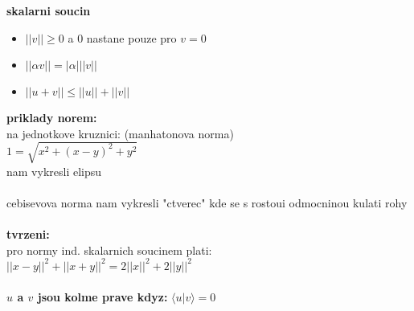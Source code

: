 \documentclass[a4paper]{article}
\begin{document}
\textbf{skalarni soucin}\\
\begin{itemize}
    \item $||v|| \geq 0$ a $0$ nastane pouze pro $v=0$
    \item $||\alpha v|| = |\alpha| ||v||$
    \item $||u+v|| \leq ||u|| + ||v||$ 
\end{itemize}

\textbf{priklady norem:}\\
na jednotkove kruznici: (manhatonova norma)\\
$1=\sqrt{x^2+(x-y)^2+y^2}$\\
nam vykresli elipsu\\
\\
cebisevova norma nam vykresli "ctverec" kde se s rostoui odmocninou kulati rohy\\
\\
\textbf{tvrzeni:}\\
pro normy ind. skalarnich soucinem plati:\\
$ ||x-y||^2 + ||x+y||^2 = 2||x||^2 + 2||y||^2 $\\
\\
\textbf{$u$ a $v$ jsou kolme prave kdyz:}
$\langle u | v \rangle = 0$\\
\\
\end{document}
